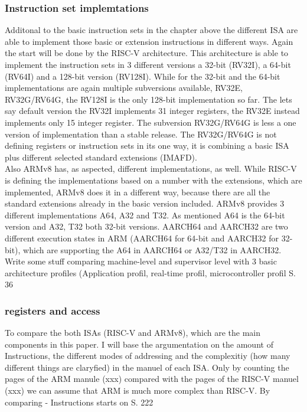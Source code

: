 \documentclass[conference]{IEEEtran}
\begin{document}
\subsubsection{Instruction set implemtations}
Additonal to the basic instruction sets in the chapter above the different \gls{ISA} are able to implement those basic or extension instructions in different ways. Again the start will be done by the RISC-V architecture. This architecture is able to implement the instruction sets in 3 different versions a 32-bit (RV32I), a 64-bit (RV64I) and a 128-bit version (RV128I).
While for the 32-bit and the 64-bit implementations are again multiple subversions available, RV32E, RV32G/RV64G, the RV128I is the only 128-bit implementation so far. The lets say default version the RV32I implements 31 integer registers, the RV32E instead implements only 15 integer register. The subversion RV32G/RV64G is less a one version of implementation than a stable release. The RV32G/RV64G is not defining registers or instruction sets in its one way, it is combining a basic \gls{ISA} plus different selected standard extensions (IMAFD). \cite{Asanovic2016} \\
Also ARMv8 has, as aspected, different implementations, as well. While RISC-V is defining the implementations based on a number with the extensions, which are implemented, ARMv8 does it in a different way, because there are all the standard extensions already in the basic version included.
ARMv8 provides 3 different implementations A64, A32 and T32. As mentioned A64 is the 64-bit version and A32, T32  both 32-bit versions.
AARCH64 and AARCH32 are two different execution states in ARM (AARCH64 for 64-bit and AARCH32 for 32-bit), which are supporting the A64 in AARCH64 or A32/T32 in AARCH32.\cite{ArmManual}\\

Write some stuff comparing machine-level and supervisor level \cite{AndrewWaterman} with 3 basic architecture profiles (Application profil, real-time profil, microcontroller profil\cite{ArmManual} S. 36

\subsubsection{registers and access}

	To compare the both \glspl{ISA} (RISC-V and ARMv8), which are the main components in this paper. I will base the argumentation on the amount of Instructions, the different modes 		of addressing and the complexitiy (how many different things are claryfied) in the manuel of each \gls{ISA}. 
	Only by counting the pages of the ARM manule (xxx) compared with the pages of the RISC-V manuel (xxx) we can assume that ARM is much more complex than RISC-V. By comparing 
	- Instructions starts on \cite{ArmManual} S. 222
\end{document}
